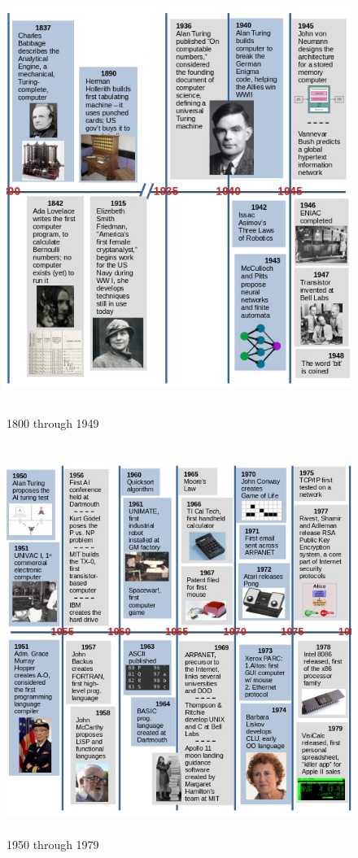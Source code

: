 \begin{figure}[H]
	\begin{center}
		\caption{1800 through 1949}
		\vskip 4pt
		\includegraphics[height=5.5in]{cs-timeline/CSHistoryTimeline-Part1b.jpg}
	\end{center}
\end{figure}

\begin{figure}[H]
	\begin{center}
		\caption{1950 through 1979}
		\vskip 4pt
		\includegraphics[height=5in]{cs-timeline/CSHistoryTimeline-Part2a.jpg}
	\end{center}
\end{figure}

